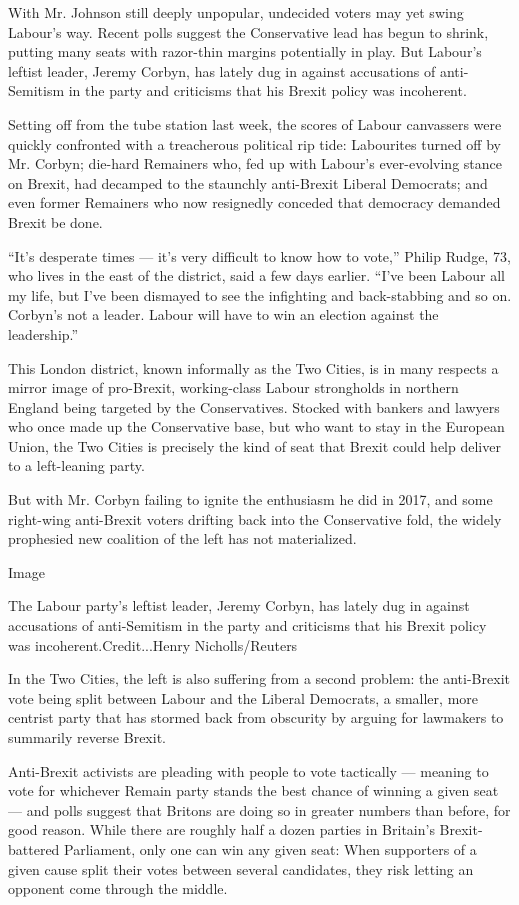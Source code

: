 With Mr. Johnson still deeply unpopular, undecided voters may yet swing
Labour's way. Recent polls suggest the Conservative lead has begun to
shrink, putting many seats with razor-thin margins potentially in play.
But Labour's leftist leader, Jeremy Corbyn, has lately dug in against
accusations of anti-Semitism in the party and criticisms that his Brexit
policy was incoherent.

Setting off from the tube station last week, the scores of Labour
canvassers were quickly confronted with a treacherous political rip
tide: Labourites turned off by Mr. Corbyn; die-hard Remainers who, fed
up with Labour's ever-evolving stance on Brexit, had decamped to the
staunchly anti-Brexit Liberal Democrats; and even former Remainers who
now resignedly conceded that democracy demanded Brexit be done.

``It's desperate times --- it's very difficult to know how to vote,''
Philip Rudge, 73, who lives in the east of the district, said a few days
earlier. ``I've been Labour all my life, but I've been dismayed to see
the infighting and back-stabbing and so on. Corbyn's not a leader.
Labour will have to win an election against the leadership.''

This London district, known informally as the Two Cities, is in many
respects a mirror image of pro-Brexit, working-class Labour strongholds
in northern England being targeted by the Conservatives. Stocked with
bankers and lawyers who once made up the Conservative base, but who want
to stay in the European Union, the Two Cities is precisely the kind of
seat that Brexit could help deliver to a left-leaning party.

But with Mr. Corbyn failing to ignite the enthusiasm he did in 2017, and
some right-wing anti-Brexit voters drifting back into the Conservative
fold, the widely prophesied new coalition of the left has not
materialized.

Image

The Labour party's leftist leader, Jeremy Corbyn, has lately dug in
against accusations of anti-Semitism in the party and criticisms that
his Brexit policy was incoherent.Credit...Henry Nicholls/Reuters

In the Two Cities, the left is also suffering from a second problem: the
anti-Brexit vote being split between Labour and the Liberal Democrats, a
smaller, more centrist party that has stormed back from obscurity by
arguing for lawmakers to summarily reverse Brexit.

Anti-Brexit activists are pleading with people to vote tactically ---
meaning to vote for whichever Remain party stands the best chance of
winning a given seat --- and polls suggest that Britons are doing so in
greater numbers than before, for good reason. While there are roughly
half a dozen parties in Britain's Brexit-battered Parliament, only one
can win any given seat: When supporters of a given cause split their
votes between several candidates, they risk letting an opponent come
through the middle.


